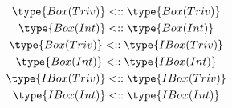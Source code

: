 \documentclass{article}
\newcommand\subtypecont{\mathrel{<::}}
\begin{document}
\begin{gather*}
  \type{Box(Triv)}  \subtypecont \type{Box(Triv)}\\
  \type{Box(Int)}   \subtypecont \type{Box(Int)}\\
  \type{Box(Triv)}  \subtypecont \type{IBox(Triv)}\\
  \type{Box(Int)}   \subtypecont \type{IBox(Int)}\\
  \type{IBox(Triv)} \subtypecont \type{IBox(Triv)}\\
  \type{IBox(Int)}  \subtypecont \type{IBox(Int)}
\end{gather*}

\end{document}
